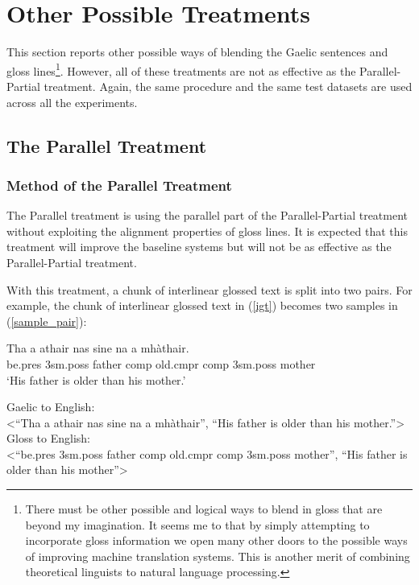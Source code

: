 \documentclass[final]{ua-thesis}
\numberwithin{equation}{section}
\begin{document}
\section{Other Possible Treatments}
This section reports other possible ways of blending the Gaelic sentences and gloss lines\footnote{There must be other possible and logical ways to blend in gloss that are beyond my imagination. It seems me to that by simply attempting to incorporate gloss information we open many other doors to the possible ways of improving machine translation systems. This is another merit of combining theoretical linguists to natural language processing.}.
However, all of these treatments are not as effective as the Parallel-Partial treatment. Again, the same procedure and the same test datasets are used across all the experiments. 


\subsection{The Parallel Treatment}\label{treatment:Para}
\subsubsection{Method of the Parallel Treatment}
The Parallel treatment is using the parallel part of the Parallel-Partial treatment without exploiting the alignment properties of gloss lines.
It is expected that this treatment will improve the baseline systems but will not be as effective as the Parallel-Partial treatment.

With this treatment, a chunk of interlinear glossed text is split into two pairs. For example, the chunk of interlinear glossed text in (\ref{igt}) becomes two samples in (\ref{sample_pair}): 
\begin{exe} 
\ex \label{igt}
	\gll    Tha a athair nas sine na a mh\`athair.\\  
            be.pres 3sm.poss father comp old.cmpr comp 3sm.poss mother \\
    \glt    `His father is older than his mother.'  
\end{exe}


\begin{exe} 
	\ex \label{sample_pair}
	\begin{xlist}
		\ex Gaelic to English: \\<``Tha a athair nas sine na a mh\`athair'', ``His father is older than his mother.''>
		\ex Gloss to English: \\<``be.pres 3sm.poss father comp old.cmpr comp 3sm.poss mother'', ``His father is older than his mother''>
	\end{xlist}
\end{exe}
\end{document}
